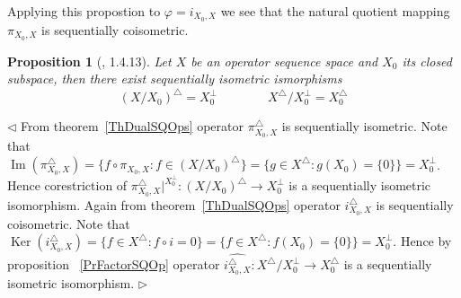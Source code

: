 \documentclass[12pt]{article}
\newtheorem{proposition}[theorem]{Proposition}
\newenvironment{proof}{\par $\triangleleft$}{$\triangleright$}
\begin{document}
Applying this propostion to $\varphi=i_{X_0,X}$ we see that the natural quotient 
mapping $\pi_{X_0,X}$ is sequentially coisometric.

\begin{proposition}[\cite{LamOpFolgen}, 1.4.13]\label{PrDualForQuotsAndSubsp} 
Let $X$ be an operator sequence space and $X_0$ its closed subspace, then 
there exist sequentially isometric ismorphisms
$$
{(X/X_0)}^\triangle= X_0^\perp\qquad\qquad X^\triangle/X_0^\perp=X_0^\triangle
$$
\end{proposition}
\begin{proof} From theorem~\ref{ThDualSQOps} operator $\pi_{X_0,X}^\triangle$ is 
sequentially isometric. Note that 
$\operatorname{Im}(\pi_{X_0,X}^\triangle)
= \{f\circ\pi_{X_0,X}:f\in {(X/X_0)}^\triangle \}
= \{g\in X^\triangle: g(X_0)= \{0 \} \}=X_0^\perp$. Hence corestriction of 
$\pi_{X_0,X}^\triangle|^{X_0^\perp}:{(X/X_0)}^\triangle\to X_0^\perp$ is a 
sequentially isometric isomorphism. Again from theorem~\ref{ThDualSQOps} 
operator $i_{X_0,X}^\triangle$ is sequentially coisometric. Note that 
$\operatorname{Ker}(i_{X_0,X}^\triangle)= \{f\in X^\triangle:f\circ i=0 \}
= \{f\in X^\triangle: f(X_0)= \{0 \} \}=X_0^\perp$. Hence by proposition 
~\ref{PrFactorSQOp} operator 
$\widehat{i_{X_0,X}^\triangle}:X^\triangle/X_0^\perp\to X_0^\triangle$ is a 
sequentially isometric isomorphism.
\end{proof}
\end{document}
